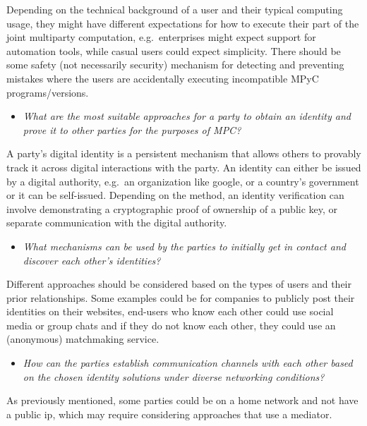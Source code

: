 \documentclass[
]{article}
\providecommand{\tightlist}{%
  \setlength{\itemsep}{0pt}\setlength{\parskip}{0pt}}
\begin{document}
Depending on the technical background of a user and their typical
computing usage, they might have different expectations for how to
execute their part of the joint multiparty computation, e.g.~enterprises
might expect support for automation tools, while casual users could
expect simplicity. There should be some safety (not necessarily
security) mechanism for detecting and preventing mistakes where the
users are accidentally executing incompatible MPyC programs/versions.

\begin{itemize}
  \tightlist
  \item
        \emph{What are the most suitable approaches for a party to obtain an
          identity and prove it to other parties for the purposes of MPC?}
\end{itemize}

A party's digital identity is a persistent mechanism that allows others
to provably track it across digital interactions with the party. An
identity can either be issued by a digital authority, e.g.~an
organization like google, or a country's government or it can be
self-issued. Depending on the method, an identity verification can
involve demonstrating a cryptographic proof of ownership of a public
key, or separate communication with the digital authority.

\begin{itemize}
  \tightlist
  \item
        \emph{What mechanisms can be used by the parties to initially get in
          contact and discover each other's identities?}
\end{itemize}

Different approaches should be considered based on the types of users
and their prior relationships. Some examples could be for companies to
publicly post their identities on their websites, end-users who know
each other could use social media or group chats and if they do not know
each other, they could use an (anonymous) matchmaking service.

\begin{itemize}
  \tightlist
  \item
        \emph{How can the parties establish communication channels with each
          other based on the chosen identity solutions under diverse networking
          conditions?}
\end{itemize}

As previously mentioned, some parties could be on a home network and not
have a public \gls{ip}, which may require considering approaches that
use a mediator.
\end{document}
